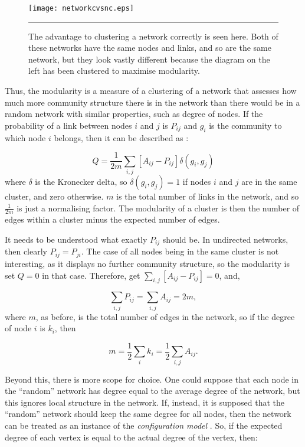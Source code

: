 \begin{figure}[t]
  \centering
  \texttt{[image: networkcvsnc.eps]}
  \rule{35em}{0.5pt}
  \caption{The advantage to clustering a network correctly is seen here.  Both 
    of these networks have the same nodes and links, and so are the same 
    network, but they look vastly different because the diagram on the left 
    has been clustered to maximise modularity.}
  \label{netclus}
\end{figure}

Thus, the modularity is a measure of a clustering of a network that assesses 
how much more community structure there is in the network than there would be 
in a random network with similar properties, such as degree of nodes.  If the 
probability of a link between nodes $i$ and $j$ is $P_{ij}$ and $g_i$ is the 
community to which node $i$ belongs, then it can be described as 
\cite{Newman2006b}:

\begin{equation}
Q = \frac{1}{2m}\sum_{i,j}[A_{ij} - P_{ij}]\delta(g_i,g_j)
\end{equation}
where $\delta$ is the Kronecker delta, so $\delta(g_i,g_j)=1$ if nodes 
$i$ and $j$ are in the same cluster, and zero otherwise. $m$ is the total 
number of links in the network, and so $\frac{1}{2m}$ is just a normalising 
factor.  The modularity of a cluster is then the number of edges within a 
cluster minus the expected number of edges.

It needs to be understood what exactly $P_{ij}$ should be.  In undirected networks, 
then clearly $P_{ij} = P_{ji}$.  The case of all nodes being in the same 
cluster is not interesting, as it displays no further community structure, so the modularity is set 
$Q=0$ in that case.  Therefore, get $\sum_{i,j}[A_{ij} - P_{ij}] = 0$, and,

\begin{equation}
\sum_{i,j}P_{ij} = \sum_{i,j} A_{ij} = 2m,
\end{equation}
where $m$, as before, is the total number of edges in the network, so if the 
degree of node $i$ is $k_i$, then

\begin{equation}
m = \frac{1}{2}\sum_i k_i = \frac{1}{2}\sum_{i,j} A_{ij}.
\end{equation}

Beyond this, there is more scope for choice.  One could suppose that each node 
in the ``random'' network has degree equal to the average degree of the 
network, but this ignores local structure in the network.  If, instead, it is supposed that 
the ``random'' network should keep the same degree for all nodes, then the network can be treated as an instance of the \emph{configuration model} \cite{BenderCanfield1978a, Bollobas1980a}.  So, if the expected 
degree of each vertex is equal to the actual degree of the vertex, then:

